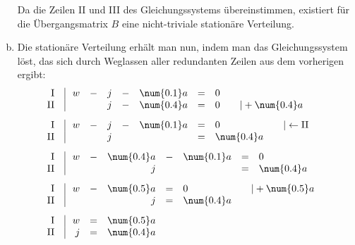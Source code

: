 \begin{exercise}
\begin{enumerate}[a)]
            \endgroup
            Da die Zeilen II und III des Gleichungssystems
            übereinstimmen, existiert für die Übergangsmatrix
            $B$ eine nicht-triviale stationäre Verteilung.
      \item Die stationäre Verteilung erhält man nun,
            indem man das Gleichungssystem löst, das
            sich durch Weglassen aller redundanten
            Zeilen aus dem vorherigen ergibt:
            \begingroup
              \renewcommand{\arraycolsep}{2pt}%
              \begin{alignat*}{1}
                &
                \begin{array}{r|rcrcrcll}
                 \text{I}\;\;&\; w & - & j & - & \num{0.1}a & = & 0 & \quad\relax \\
                \text{II}\;\;&\;   &   & j & - & \num{0.4}a & = & 0 & \quad|+\num{0.4} a
                \end{array}
                \\[1ex] &
                \begin{array}{r|rcrcrcll}
                 \text{I}\;\;&\; w & - & j & - & \num{0.1}a & = & 0          & \quad|\leftarrow\text{II} \\
                \text{II}\;\;&\;   &   & j &   &            & = & \num{0.4}a & \quad\relax
                \end{array}
                \\[1ex] &
                \begin{array}{r|rcrcrcll}
                 \text{I}\;\;&\; w & - & \num{0.4}a & - & \num{0.1}a & = & 0          & \quad\relax \\
                \text{II}\;\;&\;   &   &          j &   &            & = & \num{0.4}a & \quad\relax
                \end{array}
                \\[1ex] &
                \begin{array}{r|rcrcll}
                 \text{I}\;\;&\; w & - & \num{0.5}a & = & 0          & \quad|+\num{0.5}a \\
                \text{II}\;\;&\;   &   &          j & = & \num{0.4}a & \quad\relax
                \end{array}
                \\[1ex] &
                \begin{array}{r|rcl}
                 \text{I}\;\;&\; w & = & \num{0.5}a \\
                \text{II}\;\;&\; j & = & \num{0.4}a

\end{array}
\end{alignat*}
\end{enumerate}
\end{exercise}

